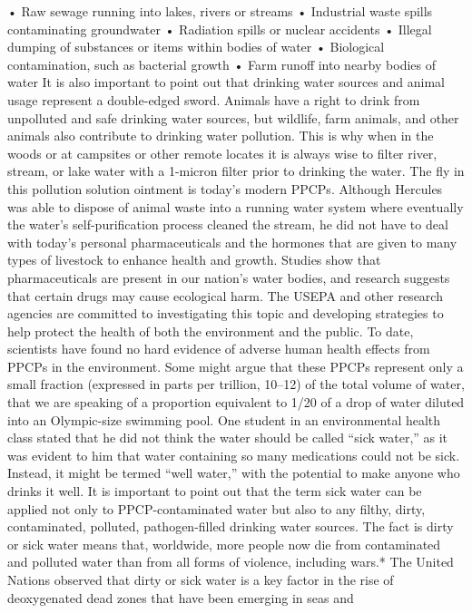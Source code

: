 \documentclass{article}
\begin{document}
• Raw sewage running into lakes, rivers or streams • Industrial waste
spills contaminating groundwater • Radiation spills or nuclear accidents
• Illegal dumping of substances or items within bodies of water •
Biological contamination, such as bacterial growth • Farm runoff into
nearby bodies of water It is also important to point out that drinking
water sources and animal usage represent a double-edged sword. Animals
have a right to drink from unpolluted and safe drinking water sources,
but wildlife, farm animals, and other animals also contribute to
drinking water pollution. This is why when in the woods or at campsites
or other remote locates it is always wise to filter river, stream, or
lake water with a 1-micron filter prior to drinking the water. The fly
in this pollution solution ointment is today's modern PPCPs. Although
Hercules was able to dispose of animal waste into a running water system
where eventually the water's self-purification process cleaned the
stream, he did not have to deal with today's personal pharmaceuticals
and the hormones that are given to many types of livestock to enhance
health and growth. Studies show that pharmaceuticals are present in our
nation's water bodies, and research suggests that certain drugs may
cause ecological harm. The USEPA and other research agencies are
committed to investigating this topic and developing strategies to help
protect the health of both the environment and the public. To date,
scientists have found no hard evidence of adverse human health effects
from PPCPs in the environment. Some might argue that these PPCPs
represent only a small fraction (expressed in parts per trillion,
10--12) of the total volume of water, that we are speaking of a
proportion equivalent to 1/20 of a drop of water diluted into an
Olympic-size swimming pool. One student in an environmental health class
stated that he did not think the water should be called ``sick water,''
as it was evident to him that water containing so many medications could
not be sick. Instead, it might be termed ``well water,'' with the
potential to make anyone who drinks it well. It is important to point
out that the term sick water can be applied not only to
PPCP-contaminated water but also to any filthy, dirty, contaminated,
polluted, pathogen-filled drinking water sources. The fact is dirty or
sick water means that, worldwide, more people now die from contaminated
and polluted water than from all forms of violence, including wars.* The
United Nations observed that dirty or sick water is a key factor in the
rise of deoxygenated dead zones that have been emerging in seas and
\end{document}
